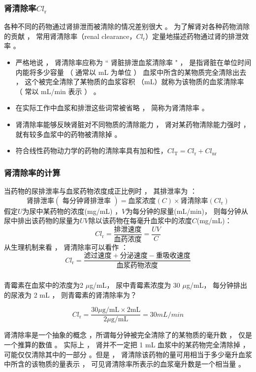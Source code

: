 \documentclass[dvipsnames, svgnames, x11names]{beamer}
\begin{document}
\begin{frame}
    \frametitle{肾清除率$Cl_\mathrm{r}$}
    各种不同的药物通过肾排泄而被清除的情况差别很大 。 为了解肾对各种药物消除的贡献 ，
常用肾清除率（renal clearance，$Cl_\mathrm{r}$）定量地描述药物通过肾的排泄效率 。   
    \begin{itemize}
    \item 严格地说 ， 肾清除率应称为 “ 肾脏排泄血浆清除率 " ， 是指肾脏在单位时间内能将多少容量 （ 通常以 mL 为单位 ） 血浆中所含的某物质完全清除出去 ， 这个被完全清除了某物质的血浆容积 （mL）就称为该物质的血浆清除率 （ 常以 mL/min 表示 ） 。
    \item 在实际工作中血浆和排泄这些词常被省略 ， 简称为肾清除率 。
    \item 肾清除率能够反映肾脏对不同物质的清除能力 ， 肾对某药物清除能力强时 ， 就有较多血浆中的药物被清除掉 。
    \item 符合线性药物动力学的药物的清除率具有加和性，$Cl_{\mathrm{T}}=Cl_{\mathrm{r}}+Cl_{\mathrm{nr}}$
    \end{itemize}
\end{frame}


\begin{frame}
    \frametitle{肾清除率的计算}
    当药物的尿排泄率与血浆药物浓度成正比例时 ， 其排泄率为 ：
    \[
        \text{肾排泄率}(\text{ 每分钟肾排泄率 })=\text{血浆浓度}(C)\times\text{肾清除率}(Cl_\mathrm{r})
    \]
    假定$U$为尿中某药物的浓度(mg/mL) ，$V$为每分钟的尿量(mL/min)， 则每分钟从尿中排出该药物的尿量为$UV$除以该药物在每毫升血浆中的浓度$C$(mg/mL)：
    \[
        Cl_\mathrm{r}=\frac{\text{排泄速度}}{\text{血药浓度}} = \frac{UV}{C}
    \]
    从生理机制来看 ， 肾清除率可以看作 ：
    \[
        Cl_\mathrm{r}=\frac{\text{滤过速度}+\text{分泌速度}-\text{重吸收速度}}{\text{血浆药物浓度}}
    \]
    
\end{frame}


\begin{frame}[t]
    \frametitle{}
    \begin{example}
        青霉素在血浆中的浓度为2 $\mu$g/mL， 尿中青霉素浓度为 30 $\mu$g/mL， 每分钟排出的尿液为 2 mL ， 则青霉素的肾清除率为？
    \end{example}
    \[
        Cl_\mathrm{r}=\frac{30 \mu \mathrm{g/mL} \times 2\mathrm{mL}}{2\mu \mathrm{g/mL}}= 30 \si{mL/min}
    \]
    \begin{blankblock}{}
        肾清除率是一个抽象的概念 ，所谓每分钟被完全清除了的某物质的毫升数 ， 仅是一个推算的数值 。 实际上 ， 肾并不一定把 1 mL 血浆中的某药物完全清除掉 ， 可能仅仅清除其中的一部分 。但是 ， 肾清除该药物的量可用相当于多少毫升血浆中所含的该物质的量表示 ， 可见肾清除率所表示的血浆毫升数是一个相当量 。 
    \end{blankblock}
\end{frame}
\end{document}
